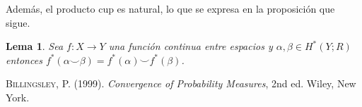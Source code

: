\documentclass[aop]{imsart2}
\theoremstyle{plain}
\newtheorem{lema}[teo]{Lema}
\theoremstyle{remark}
\begin{document}
\noindent Además, el producto cup es natural, lo que se expresa en la proposición que sigue.

\begin{lema}
    Sea $f:X\to Y$ una función continua entre espacios y $\alpha,\beta\in H^{*}(Y;R)$ entonces
    $f^{*}(\alpha\smile\beta)=f^{*}(\alpha)\smile f^{*}(\beta)$.
\end{lema}

\newpage
\begin{thebibliography}{1}
        \textsc{Billingsley, P.} (1999). 
        \textit{Convergence of Probability Measures}, 2nd ed. Wiley, New York.
    \end{thebibliography}
\end{document}
